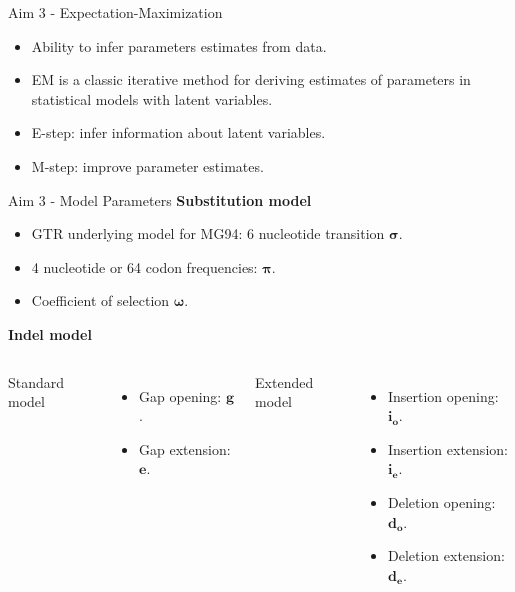 \documentclass[aspectratio=169]{beamer}
\begin{document}
\begin{frame}{Aim 3 - Expectation-Maximization} %
\begin{itemize}
	\setlength\itemsep{1em}
	\item Ability to infer parameters estimates from data.
	\item EM \parencite{dempster_laird_rubin_EM_1977} is a classic iterative
		method for deriving estimates of parameters in statistical models with
		latent variables.
	\item E-step: infer information about latent variables.
	\item M-step: improve parameter estimates.
\end{itemize}
\end{frame} %

\begin{frame}{Aim 3 - Model Parameters} %
\textbf{Substitution model}
\begin{itemize}
	\item GTR\parencite{tavare_gtr_1986} underlying model for MG94:
		6 nucleotide transition $\bm{\sigma}$.
	\item 4 nucleotide or 64 codon frequencies: $\bm{\pi}$.
	\item Coefficient of selection $\bm{\omega}$.
\end{itemize}

\vspace{2em}
\textbf{Indel model}
\begin{columns}[T]
Standard model
\begin{itemize}
	\item Gap opening: $\bm{g}$.
	\item Gap extension: $\bm{e}$.
\end{itemize}
Extended model
\begin{itemize}
	\item Insertion opening: $\bm{i_o}$.
	\item Insertion extension: $\bm{i_e}$.
	\item Deletion opening: $\bm{d_o}$.
	\item Deletion extension: $\bm{d_e}$.
\end{itemize}
\end{columns}
\end{frame} %
\end{document}
